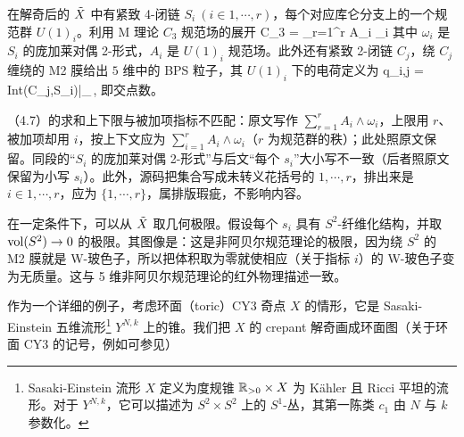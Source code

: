 \begin{center}
\end{center}

在解奇后的 $\Tilde{X}$ 中有紧致 4-闭链 $S_i \ (i\in {1,\cdots ,r})$，每个对应库仑分支上的一个规范群 $U(1)_i$。利用 M 理论 $C_3$ 规范场的展开
\be C_3 = \sum_{r=1}^r A_i \wedge \omega_i  \ee
其中 $\omega_i$ 是 $S_i$ 的庞加莱对偶 2-形式，$A_i$ 是 $U(1)_i$ 规范场。此外还有紧致 2-闭链 $C_j$，绕 $C_j$ 缠绕的 M2 膜给出 $5$ 维中的 BPS 粒子，其
$U(1)_i$ 下的电荷定义为
\be q_{i,j} = {\rm Int}(C_j,S_i)|_{}\,,  \ee
即交点数。

\begin{yizhu}[原文疑误]
（4.7）的求和上下限与被加项指标不匹配：原文写作 $\sum_{r=1}^r A_i \wedge \omega_i$，上限用 $r$、被加项却用 $i$，按上下文应为 $\sum_{i=1}^r A_i\wedge\omega_i$（$r$ 为规范群的秩）；此处照原文保留。同段的“$S_i$ 的庞加莱对偶 2-形式”与后文“每个 $s_i$”大小写不一致（后者照原文保留为小写 $s_i$）。此外，源码把集合写成未转义花括号的 $1,\cdots ,r$，排出来是 $i\in 1,\cdots ,r$，应为 $\{1,\cdots ,r\}$，属排版瑕疵，不影响内容。
\end{yizhu}

在一定条件下，可以从 $\Tilde{X}$ 取几何极限。假设每个 $s_i$ 具有 $S^2$-纤维化结构，并取 ${\rm vol}(S^2)\to 0$ 的极限。其图像是：这是非阿贝尔规范理论的极限，因为绕 $S^2$ 的 M2 膜就是 W-玻色子，所以把体积取为零就使相应（关于指标 $i$）的 W-玻色子变为无质量。这与 5 维非阿贝尔规范理论的红外物理描述一致。

作为一个详细的例子，考虑环面（toric）CY3 奇点 $X$ 的情形，它是 Sasaki-Einstein 五维流形\footnote{Sasaki-Einstein 流形 $X$ 定义为度规锥 $\mb{R}_{>0}\times X$ 为 K\"ahler 且 Ricci 平坦的流形\cite{Sparks:2010sn}。对于 $Y^{N,k}$，它可以描述为 $S^2\times S^2$ 上的 $S^1$-丛，其第一陈类 $c_1$ 由 $N$ 与 $k$ 参数化。} $Y^{N,k}$ 上的锥。我们把 $X$ 的 crepant 解奇画成环面图（关于环面 CY3 的记号，例如可参见\cite{Xie:2017pfl,Eckhard:2020jyr}）


